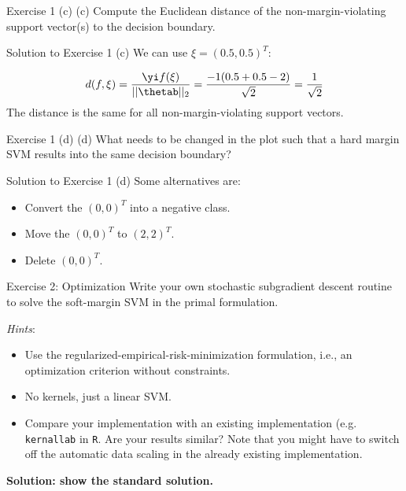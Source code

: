 \documentclass[aspectratio=169]{beamer}
\begin{document}
\begin{frame}{Exercise 1 (c)}
	(c) Compute the Euclidean distance of the non-margin-violating support vector(s) to the decision boundary.
\end{frame}

\begin{frame}{Solution to Exercise 1 (c)}
	We can use $\xi = (0.5, 0.5)^T$:
	
	\begin{align*}
		d(f, \xi) = \frac{\yi f(\xi)}{||\thetab||_2} = \frac{-1 (0.5 + 0.5 - 2)}{\sqrt{2}} = \frac{1}{\sqrt{2}}
	\end{align*}
	The distance is the same for all non-margin-violating support vectors.
\end{frame}


\begin{frame}{Exercise 1 (d)}
	(d) What needs to be changed in the plot such that a hard margin SVM results into the same decision boundary?
\end{frame}

\begin{frame}{Solution to Exercise 1 (d)}
	Some alternatives are:
	\begin{itemize}
		\item Convert the $(0, 0)^T$ into a negative class.
		\item Move the $(0, 0)^T$ to $(2, 2)^T$.
		\item Delete $(0, 0)^T$.
	\end{itemize}
\end{frame}

\begin{frame}{Exercise 2: Optimization}
	Write your own stochastic subgradient descent routine to solve the soft-margin SVM in the primal formulation.
	
	\emph{Hints}:
	\begin{itemize}
		\item Use the regularized-empirical-risk-minimization formulation, i.e., an optimization criterion without constraints.
		\item No kernels, just a linear SVM.
		\item Compare your implementation with an existing implementation (e.g. \texttt{kernallab} in \texttt{R}. Are your results similar? Note that you might have to switch off the automatic data scaling in the already existing implementation.
	\end{itemize}
	
	\textbf{Solution: show the standard solution.}
\end{frame}
\end{document}
